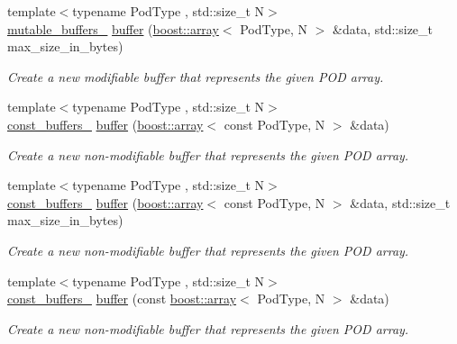 \begin{DoxyCompactItemize}
{\footnotesize template$<$typename Pod\+Type , std\+::size\+\_\+t N$>$ }\\\hyperlink{classasio_1_1mutable__buffers__1}{mutable\+\_\+buffers\+\_} \hyperlink{group__buffer_gabcdc30c4b4b6a28885f65e7c8fe08cc2}{buffer} (\hyperlink{classboost_1_1array}{boost\+::array}$<$ Pod\+Type, N $>$ \&data, std\+::size\+\_\+t max\+\_\+size\+\_\+in\+\_\+bytes)
\begin{DoxyCompactList}\small\item\em Create a new modifiable buffer that represents the given P\+O\+D array. \end{DoxyCompactList}\item 
{\footnotesize template$<$typename Pod\+Type , std\+::size\+\_\+t N$>$ }\\\hyperlink{classasio_1_1const__buffers__1}{const\+\_\+buffers\+\_} \hyperlink{group__buffer_ga7b564725e9315afaad270e46161ac21c}{buffer} (\hyperlink{classboost_1_1array}{boost\+::array}$<$ const Pod\+Type, N $>$ \&data)
\begin{DoxyCompactList}\small\item\em Create a new non-\/modifiable buffer that represents the given P\+O\+D array. \end{DoxyCompactList}\item 
{\footnotesize template$<$typename Pod\+Type , std\+::size\+\_\+t N$>$ }\\\hyperlink{classasio_1_1const__buffers__1}{const\+\_\+buffers\+\_} \hyperlink{group__buffer_gaf0529bedd017b4b01fd0920e35ed22cd}{buffer} (\hyperlink{classboost_1_1array}{boost\+::array}$<$ const Pod\+Type, N $>$ \&data, std\+::size\+\_\+t max\+\_\+size\+\_\+in\+\_\+bytes)
\begin{DoxyCompactList}\small\item\em Create a new non-\/modifiable buffer that represents the given P\+O\+D array. \end{DoxyCompactList}\item 
{\footnotesize template$<$typename Pod\+Type , std\+::size\+\_\+t N$>$ }\\\hyperlink{classasio_1_1const__buffers__1}{const\+\_\+buffers\+\_} \hyperlink{group__buffer_gacee4fc886d2abc070fbabc77ebeb508d}{buffer} (const \hyperlink{classboost_1_1array}{boost\+::array}$<$ Pod\+Type, N $>$ \&data)
\begin{DoxyCompactList}\small\item\em Create a new non-\/modifiable buffer that represents the given P\+O\+D array. \end{DoxyCompactList}\item 

\end{DoxyCompactItemize}
